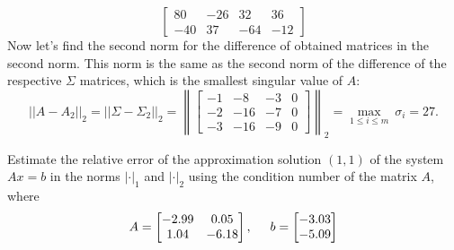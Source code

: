 \documentclass[12pt]{report}
\begin{document}
\begin{solution}
\[\begin{bmatrix}
            80 & -26 & 32 & 36 \\
            -40 & 37 & -64 & -12
         \end{bmatrix}
    \]
    Now let's find the second norm for the difference of obtained matrices in the second norm. This norm is the same as the second norm of the difference of the respective $\Sigma$ matrices, which is the smallest singular value of $A$:
    \[
      ||A-A_2||_2 = ||\Sigma - \Sigma_2||_2 = \left\lVert\begin{bmatrix}
         -1 & -8 & -3 & 0\\-2 & -16 & -7 & 0\\-3 & -16 & -9 & 0\end{bmatrix}\right\rVert_2 = \max\limits_{1\leq i\leq m}{\ \sigma_i} = 27.
    \]
\end{solution}

\begin{problem}{}
  Estimate the relative error of the approximation solution $(1,1)$ of the system $Ax = b$
 in the norms $|\cdot |_1$ and $|\cdot |_2$ using the condition number of the matrix $A$, where  \[
      A = \begin{bmatrix}
         -2.99 & 0.05 \\
         1.04 & -6.18
      \end{bmatrix}, \hspace*{0.5cm} b = \begin{bmatrix}
         -3.03 \\ 
         -5.09
      \end{bmatrix}
  \]
\end{problem}
\end{document}
